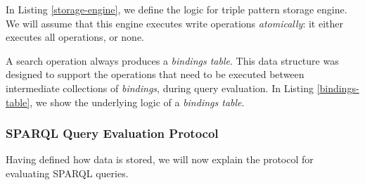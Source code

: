 In Listing \ref{storage-engine}, we define the logic for triple pattern storage engine. We will assume that this engine executes write operations \emph{atomically}: it either executes all operations, or none.

%

A search operation always produces a \emph{bindings table}. This data structure was designed to support the operations that need to be executed between intermediate collections of \emph{bindings}, during query evaluation. In Listing \ref{bindings-table}, we show the underlying logic of a \emph{bindings table}.

%

\subsubsection{SPARQL Query Evaluation Protocol}

Having defined how data is stored, we will now explain the protocol for evaluating \gls{SPARQL} queries.

